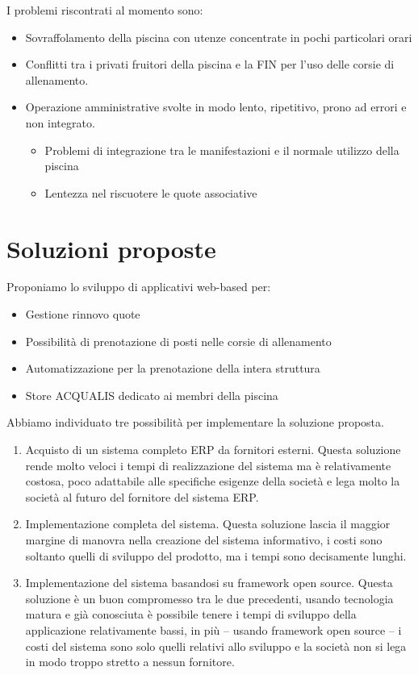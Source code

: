 \documentclass[11pt]{article} %
\begin{document}
I problemi riscontrati al momento sono:

\begin{itemize}
	\item Sovraffolamento della piscina con utenze concentrate in pochi particolari orari
	\item Conflitti tra i privati fruitori della piscina e la FIN per l'uso delle corsie di allenamento.
	\item Operazione amministrative svolte in modo lento, ripetitivo, prono ad errori e non integrato.
	\begin{itemize}
		\item Problemi di integrazione tra le manifestazioni e il normale utilizzo della piscina
		\item Lentezza nel riscuotere le quote associative
	\end{itemize}
\end{itemize}

\section{Soluzioni proposte}

Proponiamo lo sviluppo di applicativi web-based per:

\begin{itemize}
	\item Gestione rinnovo quote
	\item Possibilità di prenotazione di posti nelle corsie di allenamento
	\item Automatizzazione per la prenotazione della intera struttura
	\item Store ACQUALIS dedicato ai membri della piscina
\end{itemize}


Abbiamo individuato tre possibilità per implementare la soluzione proposta.

\begin{enumerate}
	\item Acquisto di un sistema completo ERP da fornitori esterni. Questa soluzione rende molto veloci i tempi di realizzazione del sistema ma è relativamente costosa, poco adattabile alle specifiche esigenze della società e lega molto la società al futuro del fornitore del sistema ERP.
	\item Implementazione completa del sistema. Questa soluzione lascia il maggior margine di manovra nella creazione del sistema informativo, i costi sono soltanto quelli di sviluppo del prodotto, ma i tempi sono decisamente lunghi.
	\item Implementazione del sistema basandosi su framework open source. Questa soluzione è un buon compromesso tra le due precedenti, usando tecnologia matura e già conosciuta è possibile tenere i tempi di sviluppo della applicazione relativamente bassi, in più -- usando framework open source -- i costi del sistema sono solo quelli relativi allo sviluppo e la società non si lega in modo troppo stretto a nessun fornitore.
\end{enumerate}
\end{document}
